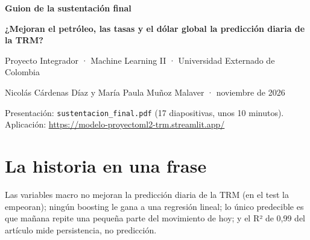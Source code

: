 \documentclass[11pt,letterpaper]{article}
\begin{document}
{\Large\textbf{Guion de la sustentación final}}\par
\textbf{¿Mejoran el petróleo, las tasas y el dólar global la predicción diaria de la TRM?}\par
Proyecto Integrador · Machine Learning II · Universidad Externado de Colombia\par
Nicolás Cárdenas Díaz y María Paula Muñoz Malaver · noviembre de 2026\par
\medskip
Presentación: \texttt{sustentacion\_final.pdf} (17 diapositivas, unos 10 minutos). Aplicación: \url{https://modelo-proyectoml2-trm.streamlit.app/}

\section*{La historia en una frase}
Las variables macro no mejoran la predicción diaria de la TRM (en el test la empeoran); ningún boosting le gana a una regresión lineal; lo único predecible es que mañana repite una pequeña parte del movimiento de hoy; y el R² de 0,99 del artículo mide persistencia, no predicción.
\end{document}
